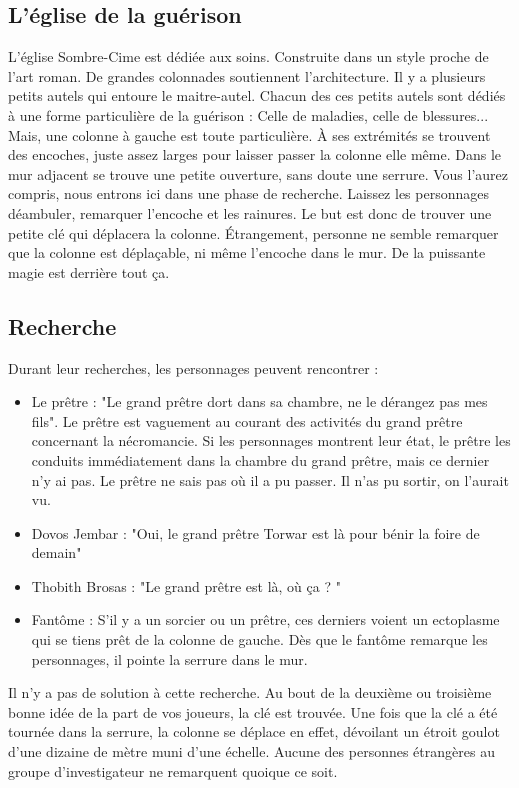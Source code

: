 \documentclass[a4paper, 11pt]{article}
\begin{document}
\subsection{L'église de la guérison}
L'église Sombre-Cime est dédiée aux soins. Construite dans un style proche de l'art roman. De grandes colonnades soutiennent l'architecture. Il y a plusieurs petits autels qui entoure le maitre-autel. Chacun des ces petits autels sont dédiés à une forme particulière de la guérison : Celle de maladies, celle de blessures... Mais, une colonne à gauche est toute particulière. À ses extrémités se trouvent des encoches, juste assez larges pour laisser passer la colonne elle même. Dans le mur adjacent se trouve une petite ouverture, sans doute une serrure. Vous l'aurez compris, nous entrons ici dans une phase de recherche. Laissez les personnages déambuler, remarquer l'encoche et les rainures. Le but est donc de trouver une petite clé qui déplacera la colonne. Étrangement, personne ne semble remarquer que la colonne est déplaçable, ni même l'encoche dans le mur. De la puissante magie est derrière tout ça.

\subsection{Recherche}
Durant leur recherches, les personnages peuvent rencontrer :
\begin{itemize}
\item Le prêtre : "Le grand prêtre dort dans sa chambre, ne le dérangez pas mes fils". Le prêtre est vaguement au courant des activités du grand prêtre concernant la nécromancie. Si les personnages montrent leur état, le prêtre les conduits immédiatement dans la chambre du grand prêtre, mais ce dernier n'y ai pas. Le prêtre ne sais pas où il  a pu passer. Il n'as pu sortir, on l’aurait vu.
\item Dovos Jembar : "Oui, le grand prêtre Torwar est là pour bénir la foire de demain"
\item Thobith Brosas : "Le grand prêtre est là, où ça ? "
\item Fantôme : S'il y a un sorcier ou un prêtre, ces derniers voient un ectoplasme qui se tiens prêt de la colonne de gauche. Dès que le fantôme remarque les personnages, il pointe la serrure dans le mur.
\end{itemize}

Il n'y a pas de solution à cette recherche. Au bout de la deuxième ou troisième bonne idée de la part de vos joueurs, la clé est trouvée.
\newline
Une fois que la clé a été tournée dans la serrure, la colonne se déplace en effet, dévoilant un étroit goulot d'une dizaine de mètre muni d'une échelle. Aucune des personnes étrangères au groupe d'investigateur ne remarquent quoique ce soit.
\end{document}
